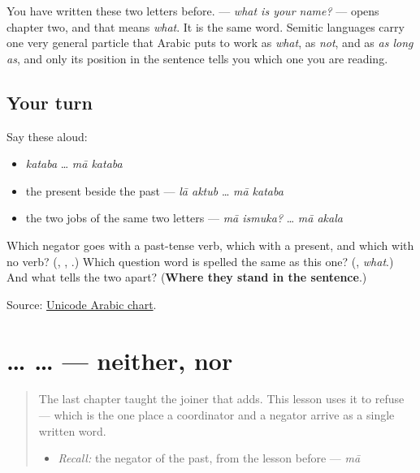 \begin{cousinweb}
You have written these two letters before. \textbf{ } — \emph{what is your name?} — opens chapter two, and that \textbf{} means \emph{what}. It is the same word. Semitic languages carry one very general particle that Arabic puts to work as \emph{what}, as \emph{not}, and as \emph{as long as}, and only its position in the sentence tells you which one you are reading.
\end{cousinweb}

\subsection*{Your turn}
Say these aloud:

\begin{itemize}
\raggedright
  \item \emph{kataba} … \emph{mā kataba}
  \item the present beside the past — \emph{lā aktub} … \emph{mā kataba}
  \item the two jobs of the same two letters — \emph{mā ismuka?} … \emph{mā akala}
\end{itemize}

\begin{tcolorbox}[breakable,colback=teal!4,colframe=teal!35!black,title={Before you move on}]
Which negator goes with a past-tense verb, which with a present, and which with no verb? (\textbf{}, \textbf{}, \textbf{}.) Which question word is spelled the same as this one? (\textbf{}, \emph{what}.) And what tells the two apart? (\textbf{Where they stand in the sentence}.)

Source: \href{https://www.unicode.org/charts/PDF/U0600.pdf}{Unicode Arabic chart}.
\end{tcolorbox}
\section[\texorpdfstring{\ar{لا} … \ar{ولا} … (lā … wa-lā …)}{لا … ولا … (lā … wa-lā …)}]{ …  … — neither, nor}

\label{lesson:AR-C39-la-wala}



\begin{quote}
The last chapter taught the joiner that adds. This lesson uses it to refuse — which is the one place a coordinator and a negator arrive as a single written word.

\begin{itemize}
\raggedright
  \item \emph{Recall:} the negator of the past, from the lesson before — \emph{mā}
\end{itemize}
\end{quote}

